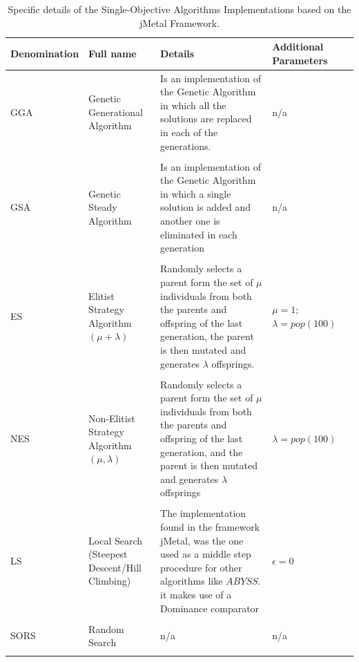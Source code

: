 \begin{table}[H]
    \begin{tabular}{p{}p{}p{}p{}p{}}
    \hline
    Denomination  & Full name & Details & Additional Parameters
    \\
    \hline
    GGA & Genetic Generational Algorithm & Is an implementation of the Genetic Algorithm in which all the solutions are replaced in each of the generations. & n/a \\ \\
    GSA & Genetic Steady Algorithm & Is an implementation of the Genetic Algorithm in which a single solution is added and another one is eliminated in each generation & n/a \\ \\
    ES & Elitist Strategy Algorithm $(\mu + \lambda)$ & Randomly selects a parent form the set of $\mu$ individuals from both the parents and offspring of the last generation, the parent is then mutated and generates $\lambda$ offsprings. & $\mu = 1$; $\lambda = pop (100)$ \\ \\
    NES & Non-Elitist Strategy Algorithm $(\mu,\lambda)$ & Randomly selects a parent form the set of $\mu$ individuals from both the parents and offspring of the last generation, and the parent is then mutated and generates $\lambda$ offsprings  & $\lambda = pop (100)$ \\ \\
    LS & Local Search (Steepest Descent/Hill Climbing) & The implementation found in the framework jMetal, was the one used as a middle step procedure for other algorithms like $ABYSS$. it makes use of a Dominance comparator & $\epsilon = 0$ \\ \\
    SORS & Random Search & n/a & n/a  \\ \\
    \hline
    \end{tabular}
    \caption{Specific details of the Single-Objective Algorithms Implementations based on the jMetal Framework.}
    \label{table:(SOA)_details_jmetal}
\end{table}

